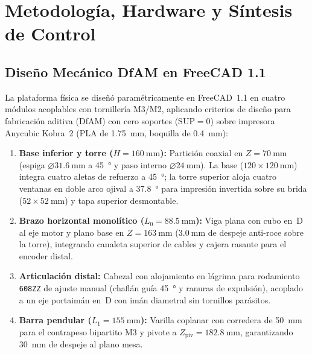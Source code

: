 \section{Metodología, Hardware y Síntesis de Control}\label{sec:metodologia}

\subsection{Diseño Mecánico DfAM en FreeCAD 1.1}\label{subsec:dfam}
La plataforma física se diseñó paramétricamente en FreeCAD~1.1 en cuatro módulos acoplables con tornillería M3/M2, aplicando criterios de diseño para fabricación aditiva (DfAM) con cero soportes ($\text{SUP}=0$) sobre impresora Anycubic Kobra~2 (PLA de \qty{1.75}{\milli\meter}, boquilla de \qty{0.4}{\milli\meter}):
\begin{enumerate}
    \item \textbf{Base inferior y torre ($H=\qty{160}{\milli\meter}$):} Partición coaxial en $Z=\qty{70}{\milli\meter}$ (espiga $\varnothing\qty{31.6}{\milli\meter}$ a \qty{45}{\degree} y paso interno $\varnothing\qty{24}{\milli\meter}$). La base ($120\times\qty{120}{\milli\meter}$) integra cuatro aletas de refuerzo a \qty{45}{\degree}; la torre superior aloja cuatro ventanas en doble arco ojival a \qty{37.8}{\degree} para impresión invertida sobre su brida ($52\times\qty{52}{\milli\meter}$) y tapa superior desmontable.
    \item \textbf{Brazo horizontal monolítico ($L_0=\qty{88.5}{\milli\meter}$):} Viga plana con cubo en~D al eje motor y plano base en $Z=\qty{163}{\milli\meter}$ ($\qty{3.0}{\milli\meter}$ de despeje anti-roce sobre la torre), integrando canaleta superior de cables y cajera rasante para el encoder distal.
    \item \textbf{Articulación distal:} Cabezal con alojamiento en lágrima para rodamiento \texttt{608ZZ} de ajuste manual (chaflán guía \qty{45}{\degree} y ranuras de expulsión), acoplado a un eje portaimán en~D con imán diametral sin tornillos parásitos.
    \item \textbf{Barra pendular ($L_1=\qty{155}{\milli\meter}$):} Varilla coplanar con corredera de \qty{50}{\milli\meter} para el contrapeso bipartito M3 y pivote a $Z_{\text{piv}}=\qty{182.8}{\milli\meter}$, garantizando \qty{30}{\milli\meter} de despeje al plano mesa.
\end{enumerate}


